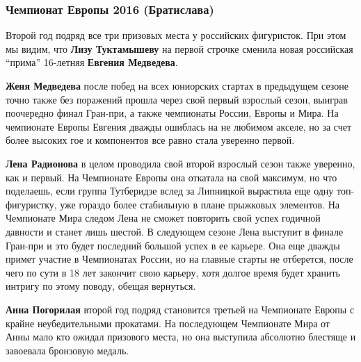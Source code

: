  
 
 
 
 
\subsubsection{Чемпионат Европы 2016 (Братислава)}
\label{sec:04_01_2022.yz.figurka_ot_maksima_jagudina.1.chempionaty_evropy.6.bratislava_2016}

Второй год подряд все три призовых места у российских фигуристок. При этом мы
видим, что \textbf{Лизу Туктамышеву} на первой строчке сменила новая российская
\enquote{прима} 16-летняя \textbf{Евгения Медведева}. 


\textbf{Женя Медведева} после побед на всех юниорских стартах в предыдущем сезоне точно
также без поражений прошла через свой первый взрослый сезон, выиграв поочередно
финал Гран-при, а также чемпионаты России, Европы и Мира. На чемпионате Европы
Евгения дважды ошиблась на не любимом акселе, но за счет более высоких гое и
компонентов все равно стала уверенно первой.


\textbf{Лена Радионова} в целом проводила свой второй взрослый сезон также уверенно, как
и первый. На Чемпионате Европы она откатала на свой максимум, но что поделаешь,
если группа Тутберидзе вслед за Липницкой вырастила еще одну топ-фигуристку,
уже гораздо более стабильную в плане прыжковых элементов. На Чемпионате Мира
следом Лена не сможет повторить свой успех годичной давности и станет лишь
шестой. В следующем сезоне Лена выступит в финале Гран-при и это будет
последний большой успех в ее карьере. Она еще дважды примет участие в
Чемпионатах России, но на главные старты не отберется, после чего по сути в 18
лет закончит свою карьеру, хотя долгое время будет хранить интригу по этому
поводу, обещая вернуться.

\textbf{Анна Погорилая} второй год подряд становится третьей на Чемпионате Европы с
крайне неубедительными прокатами. На последующем Чемпионате Мира от Анны мало
кто ожидал призового места, но она выступила абсолютно блестяще и завоевала
бронзовую медаль.
